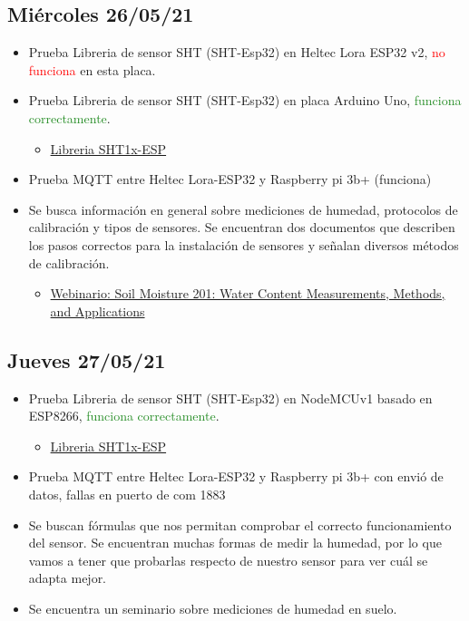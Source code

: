\subsection*{Miércoles 26/05/21}
\begin{itemize}
    \item Prueba Libreria de sensor SHT (SHT-Esp32) en Heltec Lora ESP32 v2, \textcolor{red}{no funciona} en esta placa.
    \item Prueba Libreria de sensor SHT (SHT-Esp32) en placa Arduino Uno, \textcolor{ForestGreen}{funciona correctamente}.
        \begin{itemize}
            \item \href{https://github.com/beegee-tokyo/SHT1x-ESP}{Libreria SHT1x-ESP}
        \end{itemize}
    \item Prueba MQTT entre Heltec Lora-ESP32 y Raspberry pi 3b+ (funciona)
    \item Se busca información en general sobre mediciones de humedad, protocolos de calibración y tipos de sensores. Se encuentran dos documentos que describen los pasos correctos para la instalación de sensores y señalan diversos métodos de calibración.
        \begin{itemize}
            \item \href{https://www.metergroup.com/environment/events/soil-moisture-201-measurements-methods-and-applications/}{Webinario: Soil Moisture 201: Water Content Measurements, Methods, and Applications}
        \end{itemize}
    
\end{itemize}

\subsection*{Jueves 27/05/21}
\begin{itemize}
    \item Prueba Libreria de sensor SHT (SHT-Esp32) en NodeMCUv1 basado en ESP8266, \textcolor{ForestGreen}{funciona correctamente}.
        \begin{itemize}
            \item \href{https://github.com/beegee-tokyo/SHT1x-ESP}{Libreria SHT1x-ESP}
        \end{itemize}
    \item Prueba MQTT entre Heltec Lora-ESP32 y Raspberry pi 3b+ con envió de datos, fallas en puerto de com 1883 
    \item Se buscan fórmulas que nos permitan comprobar el correcto funcionamiento del sensor. Se encuentran muchas formas de medir la humedad, por lo que vamos a tener que probarlas respecto de nuestro sensor para ver cuál se adapta mejor.
    \item Se encuentra un seminario sobre mediciones de humedad en suelo.
    
\end{itemize}
